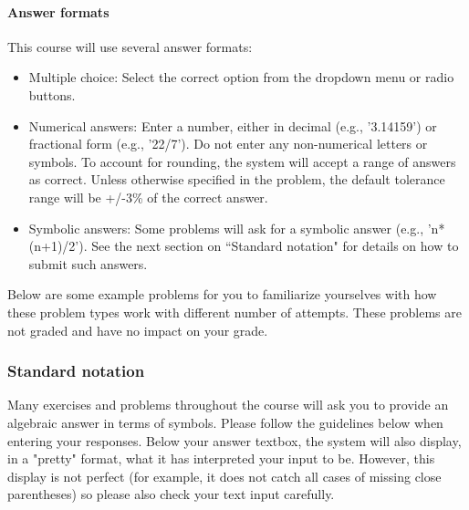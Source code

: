 \documentclass[pdftex, brazil, 12pt, twoside]{article}
\begin{document}
\paragraph{Answer formats} This course will use several answer formats:

\begin{itemize}[noitemsep]
\item Multiple choice: Select the correct option from the dropdown menu or radio buttons.
\item Numerical answers: Enter a number, either in decimal (e.g., '3.14159') or fractional
  form (e.g., '22/7'). Do not enter any non-numerical letters or symbols. To account for
  rounding, the system will accept a range of answers as correct. Unless otherwise specified
  in the problem, the default tolerance range will be +/-3\% of the correct answer.
\item Symbolic answers: Some problems will ask for a symbolic answer (e.g., 'n*(n+1)/2').
  See the next section on “Standard notation" for details on how to submit such answers. 
\end{itemize}

Below are some example problems for you to familiarize yourselves with how these problem
types work with different number of attempts. These problems are not graded and have no
impact on your grade.

\subsubsection{Standard notation}
\label{ovw0-hw-standard}

Many exercises and problems throughout the course will ask you to provide an
algebraic answer in terms of symbols. Please follow the guidelines below when
entering your responses. Below your answer textbox, the system will also display,
in a "pretty" format, what it has interpreted your input to be. However, this display
is not perfect (for example, it does not catch all cases of missing close parentheses)
so please also check your text input carefully.
\end{document}
